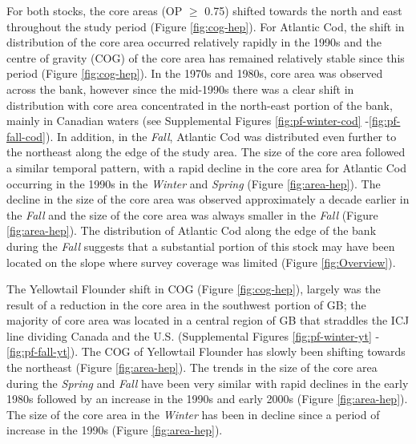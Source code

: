 \documentclass[
]{article}
\begin{document}
For both stocks, the core areas (OP \(\geq\) 0.75) shifted towards the north and east throughout the study period (Figure \ref{fig:cog-hep}). For Atlantic Cod, the shift in distribution of the core area occurred relatively rapidly in the 1990s and the centre of gravity (COG) of the core area has remained relatively stable since this period (Figure \ref{fig:cog-hep}). In the 1970s and 1980s, core area was observed across the bank, however since the mid-1990s there was a clear shift in distribution with core area concentrated in the north-east portion of the bank, mainly in Canadian waters (see Supplemental Figures \ref{fig:pf-winter-cod} -\ref{fig:pf-fall-cod}). In addition, in the \emph{Fall}, Atlantic Cod was distributed even further to the northeast along the edge of the study area. The size of the core area followed a similar temporal pattern, with a rapid decline in the core area for Atlantic Cod occurring in the 1990s in the \emph{Winter} and \emph{Spring} (Figure \ref{fig:area-hep}). The decline in the size of the core area was observed approximately a decade earlier in the \emph{Fall} and the size of the core area was always smaller in the \emph{Fall} (Figure \ref{fig:area-hep}). The distribution of Atlantic Cod along the edge of the bank during the \emph{Fall} suggests that a substantial portion of this stock may have been located on the slope where survey coverage was limited (Figure \ref{fig:Overview}).

The Yellowtail Flounder shift in COG (Figure \ref{fig:cog-hep}), largely was the result of a reduction in the core area in the southwest portion of GB; the majority of core area was located in a central region of GB that straddles the ICJ line dividing Canada and the U.S. (Supplemental Figures \ref{fig:pf-winter-yt} -\ref{fig:pf-fall-yt}). The COG of Yellowtail Flounder has slowly been shifting towards the northeast (Figure \ref{fig:area-hep}). The trends in the size of the core area during the \emph{Spring} and \emph{Fall} have been very similar with rapid declines in the early 1980s followed by an increase in the 1990s and early 2000s (Figure \ref{fig:area-hep}). The size of the core area in the \emph{Winter} has been in decline since a period of increase in the 1990s (Figure \ref{fig:area-hep}).
\end{document}
